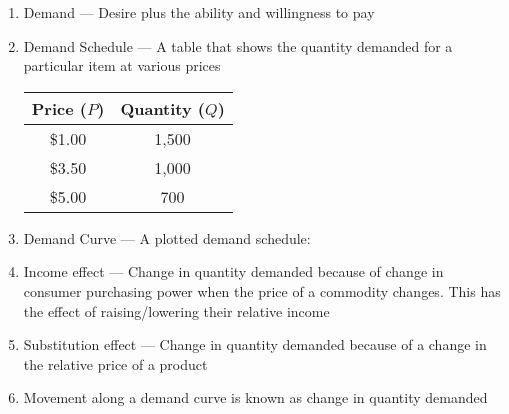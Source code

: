 \documentclass[12pt]{article}
\begin{document}
\begin{enumerate}
\begin{itemize}
    \end{itemize}

  \item Demand — Desire plus the ability and willingness to pay

  \item Demand Schedule — A table that shows the quantity demanded for a particular item at various prices

    \begin{center}

      \begin{tabular}{| c | c |}

        \hline
        Price ($P$) & Quantity ($Q$)\\
        \hline
        \$1.00 & 1,500\\
        \hline
        \$3.50 & 1,000\\
        \hline
        \$5.00 & 700\\
        \hline

      \end{tabular}

    \end{center}

  \item Demand Curve — A plotted demand schedule:

    \begin{center}
    \end{center}

  \item Income effect — Change in quantity demanded because of change in consumer purchasing power when the price of a commodity changes. This has the effect of raising/lowering their relative income

  \item Substitution effect — Change in quantity demanded because of a change in the relative price of a product

  \item Movement along a demand curve is known as change in quantity demanded


\end{enumerate}
\end{document}
